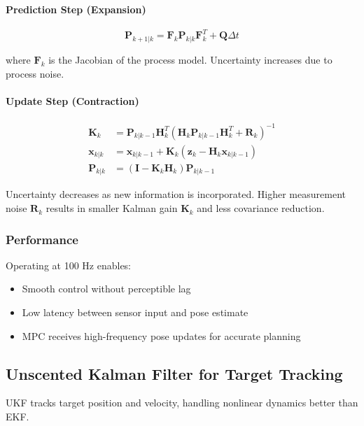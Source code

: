 \documentclass[11pt,a4paper]{article}
\begin{document}
\paragraph{Prediction Step (Expansion)}
\begin{equation}
\mathbf{P}_{k+1|k} = \mathbf{F}_k \mathbf{P}_{k|k} \mathbf{F}_k^T + \mathbf{Q} \Delta t
\end{equation}

where $\mathbf{F}_k$ is the Jacobian of the process model. Uncertainty increases due to process noise.

\paragraph{Update Step (Contraction)}
\begin{align}
\mathbf{K}_k &= \mathbf{P}_{k|k-1} \mathbf{H}_k^T (\mathbf{H}_k \mathbf{P}_{k|k-1} \mathbf{H}_k^T + \mathbf{R}_k)^{-1} \nonumber \\
\mathbf{x}_{k|k} &= \mathbf{x}_{k|k-1} + \mathbf{K}_k (\mathbf{z}_k - \mathbf{H}_k \mathbf{x}_{k|k-1}) \nonumber \\
\mathbf{P}_{k|k} &= (\mathbf{I} - \mathbf{K}_k \mathbf{H}_k) \mathbf{P}_{k|k-1} \nonumber
\end{align}

Uncertainty decreases as new information is incorporated. Higher measurement noise $\mathbf{R}_k$ results in smaller Kalman gain $\mathbf{K}_k$ and less covariance reduction.

\subsubsection{Performance}

Operating at 100 Hz enables:
\begin{itemize}
    \item Smooth control without perceptible lag
    \item Low latency between sensor input and pose estimate
    \item MPC receives high-frequency pose updates for accurate planning
\end{itemize}

\subsection{Unscented Kalman Filter for Target Tracking}

UKF tracks target position and velocity, handling nonlinear dynamics better than EKF.
\end{document}
